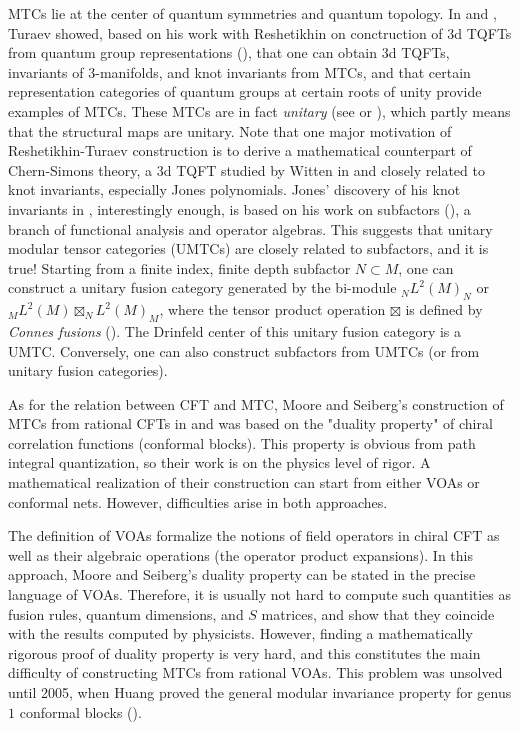\documentclass[10pt]{amsart}
\theoremstyle{definition}
\theoremstyle{plain}
\begin{document}
MTCs lie at the center of quantum symmetries and quantum topology. In \cite{T MC} and \cite{T book}, Turaev showed, based on his work with Reshetikhin on conctruction of 3d TQFTs from quantum group representations (\cite{RT}), that one can obtain 3d TQFTs, invariants of 3-manifolds, and knot invariants from MTCs, and that certain representation categories of quantum groups at certain roots of unity provide examples of MTCs. These MTCs are in fact \emph{unitary} (see \cite{Wenzl unitary} or \cite{Xu unitary}), which partly means that the structural maps are unitary. Note that one major motivation of  Reshetikhin-Turaev construction is to derive a mathematical counterpart of Chern-Simons theory, a 3d TQFT studied by Witten in \cite{Witten Jones} and closely related to knot invariants, especially Jones polynomials. Jones' discovery of his knot invariants  in \cite{Jones polynomials}, interestingly enough, is based on his work on subfactors (\cite{Jones subfactors}), a branch of functional analysis and operator algebras. This suggests that unitary modular tensor categories (UMTCs) are closely related to subfactors, and it is true! Starting from a  finite index, finite depth subfactor $N\subset M$, one can construct a unitary fusion category generated by the bi-module ${}_NL^2(M)_N$ or ${}_ML^2(M)\boxtimes_{N}L^2(M)_M$, where the tensor product operation $\boxtimes$ is defined by \emph{Connes fusions} (\cite{Connes fusion}). The Drinfeld center of this unitary fusion category is a UMTC. Conversely, one can also construct subfactors from UMTCs (or from unitary fusion categories).


As for the relation between CFT and MTC, Moore and Seiberg's construction of MTCs from rational CFTs in \cite{MS poly} and \cite{MS CQ} was based on the "duality property" of chiral correlation functions (conformal blocks). This property is obvious from path integral quantization, so their work is on the physics level of rigor. A mathematical realization of their construction can start from either VOAs or conformal nets. However, difficulties arise in both approaches.

The definition of VOAs formalize the notions of field operators in chiral CFT as well as their algebraic operations (the operator product expansions). In this approach,  Moore and Seiberg's duality property can  be stated in the precise language of VOAs. Therefore, it is usually  not hard to compute such quantities  as fusion rules, quantum dimensions, and  $S$ matrices, and show that they coincide with the results computed by physicists. However, finding a mathematically rigorous proof of duality property is very hard, and this constitutes the main difficulty of constructing MTCs from rational VOAs. This problem was unsolved until 2005, when Huang proved the general modular invariance property for genus $1$ conformal blocks (\cite{H modular}). 
\end{document}

